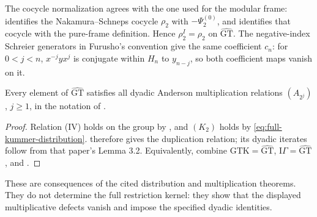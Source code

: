 The cocycle normalization agrees with the one used for the modular
frame: \cite[\S2.2, footnote on p.~100]{Furusho2003} identifies the
Nakamura--Schneps cocycle $\rho_2$ with $-\Psi_2^{(0)}$, and
\cite[Lemma 7(a) and Proposition 11]{H17} identifies that cocycle
with the pure-frame definition. Hence $\rho_2^I=\rho_2$ on
$\widehat{\mathrm{GT}}$. The negative-index Schreier generators in
Furusho's convention give the same coefficient $c_n$: for $0<j<n$,
$x^{-j}yx^j$ is conjugate within $H_n$ to $y_{n-j}$, so both
coefficient maps vanish on it.

\begin{corollary}\label{cor:dyadic-anderson}
Every element of $\widehat{\mathrm{GT}}$ satisfies all dyadic
Anderson multiplication relations $(A_{2^j})$, $j\geq1$, in the
notation of \cite[Definition 2.3]{Furusho2003}.
\end{corollary}
\begin{proof}
Relation (IV) holds on the group by \cite[Theorem 1]{H17}, and
$(K_2)$ holds by \eqref{eq:full-kummer-distribution}.
\cite[Theorem 3.1]{Furusho2003} therefore gives the duplication
relation; its dyadic iterates follow from that paper's Lemma 3.2.
Equivalently, combine
$\mathrm{GTK}=\widehat{\mathrm{GT}}$,
$\mathrm{I}\Gamma=\widehat{\mathrm{GT}}$
\cite[Corollary 21]{H17}, and
\cite[Theorem 3.4]{Furusho2003}.
\end{proof}

These are consequences of the cited distribution and multiplication
theorems. They do not determine the full restriction kernel: they show
that the displayed multiplicative defects vanish and impose the
specified dyadic identities.
